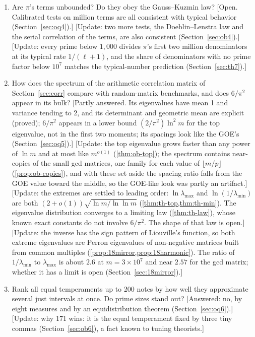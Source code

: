 \begin{enumerate}
\item Are $\pi$'s terms unbounded? Do they obey the Gauss--Kuzmin law? [Open. Calibrated tests on \OqNTm{} million terms are all consistent with typical behavior (Section~\ref{sec:oq4}).] \addedon{\revA} [Update: two more tests, the Doeblin--Lenstra law and the serial correlation of the terms, are also consistent (Section~\ref{sec:ob4}).] \addedon{\revB} [Update: every prime below $1{,}000$ divides $\pi$'s first two million denominators at its typical rate $1/(\ell + 1)$, and the share of denominators with no prime factor below $10^7$ matches the typical-number prediction (Section~\ref{sec:th7}).] \addedon{\revC}
\item How does the spectrum of the arithmetic correlation matrix of Section~\ref{sec:corr} compare with random-matrix benchmarks, and does $6/\pi^2$ appear in its bulk? [Partly answered. Its eigenvalues have mean 1 and variance tending to 2, and its determinant and geometric mean are explicit (proved); $6/\pi^2$ appears in a lower bound $(2/\pi^2)\ln^2 m$ for the top eigenvalue, not in the first two moments; its spacings look like the GOE's (Section~\ref{sec:oq5}).] \addedon{\revA} [Update: the top eigenvalue grows faster than any power of $\ln m$ and at most like $m^{o(1)}$ (\cref{thm:ob-top}); the spectrum contains near-copies of the small gcd matrices, one family for each value of $\lfloor m/p\rfloor$ (\cref{prop:ob-copies}), and with these set aside the spacing ratio falls from the GOE value toward the middle, so the GOE-like look was partly an artifact.] \addedon{\revB} [Update: the extremes are settled to leading order: $\ln\lambda_{\max}$ and $\ln(1/\lambda_{\min})$ are both $(2 + o(1))\sqrt{\ln m/\ln\ln m}$ (\cref{thm:th-top,thm:th-min}). The eigenvalue distribution converges to a limiting law (\cref{thm:th-law}), whose known exact constants do not involve $6/\pi^2$. The shape of that law is open.] \addedon{\revC} [Update: the inverse has the sign pattern of Liouville's function, so both extreme eigenvalues are Perron eigenvalues of non-negative matrices built from common multiples (\cref{prop:18mirror,prop:18harmonic}). The ratio of $1/\lambda_{\min}$ to $\lambda_{\max}$ is about $2.6$ at $m = 3\times10^7$ and near $2.57$ for the gcd matrix; whether it has a limit is open (Section~\ref{sec:18mirror}).] \addedon{\revD}
\item Rank all equal temperaments up to 200 notes by how well they approximate several just intervals at once. Do prime sizes stand out? [Answered: no, by eight measures and by an equidistribution theorem (Section~\ref{sec:oq6}).] \addedon{\revA} [Update: why 171 wins: it is the equal temperament fixed by three tiny commas (Section~\ref{sec:ob6}), a fact known to tuning theorists.] \addedon{\revB}
\end{enumerate}

